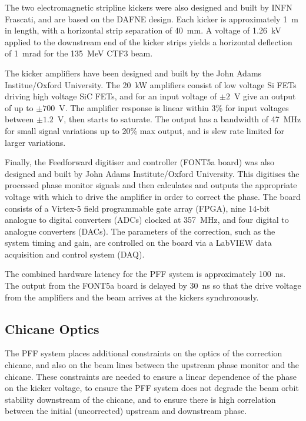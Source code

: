 \documentclass[%
 reprint,
 amsmath,amssymb,
 prl,
]{revtex4-1}
\begin{document}
The two electromagnetic stripline kickers were also designed and built by INFN 
Frascati,  
and are based on the DAFNE design. Each kicker is approximately 1~m in length, 
with a horizontal strip separation of 40~mm. A voltage of 1.26~kV applied to 
the 
downstream end of the kicker strips yields a horizontal deflection of 1~mrad 
for the 135~MeV CTF3 beam.

The kicker amplifiers have been designed and built by the John Adams 
Institue/Oxford University. The 20~kW amplifiers consist of low voltage Si FETs 
driving high voltage SiC FETs, and for 
an input voltage of \(\pm2\)~V give an output of up to \(\pm700\)~V. The 
amplifier response is linear within 
3\% for input voltages between \(\pm1.2\)~V, then starts to saturate. The 
output 
has a bandwidth of 47~MHz for small signal variations up to 20\% max output, 
and is slew rate limited for larger variations.

Finally, the Feedforward digitiser and controller (FONT5a board) was also 
designed and built by John Adams Institute/Oxford University. This digitises 
the 
processed phase monitor signals and then calculates and outputs the appropriate 
voltage with which to drive the amplifier in order to correct the phase. The 
board consists of a Virtex-5 field programmable gate array (FPGA), nine 14-bit 
analogue to digital converters (ADCs) clocked at 357~MHz, and four digital to 
analogue converters (DACs). The parameters of the correction, such as the 
system timing and gain, are controlled on the board via a LabVIEW data 
acquisition and control system (DAQ).

The combined hardware latency for the PFF system is approximately 100~ns. The 
output from the FONT5a board is delayed by 30~ns so that the drive voltage from 
the amplifiers and the beam arrives at the kickers synchronously.

\subsection{\label{ss:optics}Chicane Optics}

The PFF system places additional constraints on the optics of the correction 
chicane, and also on the beam lines between the upstream phase monitor and the 
chicane. These constraints are needed to ensure a linear dependence of the 
phase on the kicker voltage, to ensure the PFF system does not degrade the beam 
orbit stability downstream of the chicane, and to ensure there is high 
correlation between the initial (uncorrected) upstream and downstream phase.
\end{document}
